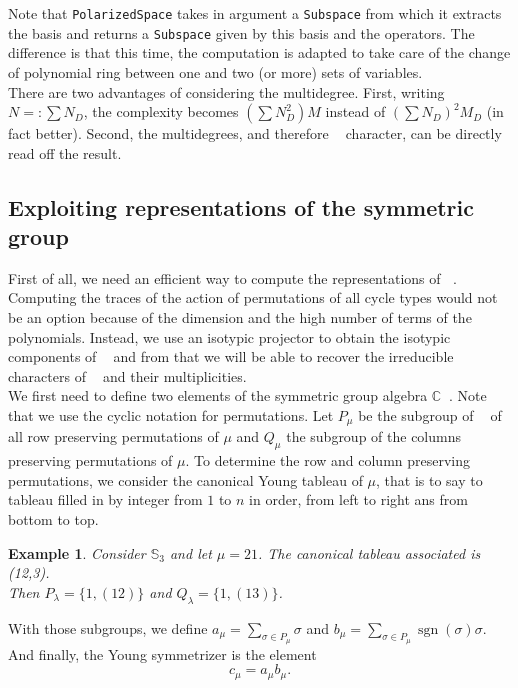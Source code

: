 \documentclass[letter,12pt]{article}
\newcommand{\CC}{\mathbb{C}}
\newcommand{\Sym}[1]{\mathbb{S}_{#1}}
\DeclareMathOperator{\Sn}{\mathbb{S}_n}
\DeclareMathOperator{\GLr}{GL_r}
\DeclareMathOperator{\sgn}{sgn}
\newtheorem{example}{Example}
\newcommand{\tableau}{\YFrench \Yboxdim{10pt}\young}
\begin{document}
	Note that \texttt{PolarizedSpace} takes in argument a \texttt{Subspace} from which it extracts the basis and returns a \texttt{Subspace} given by this basis and the operators. The difference is that this time, the computation is adapted to take care of the change of polynomial ring between one and two (or more) sets of variables. \\
	
	There are two advantages of considering the multidegree. 
	First, writing $N=:\sum N_D$, the complexity becomes $(\sum N_D^2) M$ instead of $(\sum N_D)^2M_D$ (in fact better).
	Second, the multidegrees, and therefore $\GLr$ character, can be directly read off the result.
	
	\subsection{Exploiting representations of the symmetric group}
	
	First of all, we need an efficient way to compute the representations of $\Sn$. Computing the traces of the action of permutations of all cycle types would not be an option because of the dimension and the high number of terms of the polynomials. 
	Instead, we use an isotypic projector to obtain the isotypic components of $\Sn$ and from that we will be able to recover the irreducible characters of $\Sn$ and their multiplicities. \\
	
	We first need to define two elements of the symmetric group algebra $\CC \Sn$. Note that we use the cyclic notation for permutations.
	Let $P_{\mu}$ be the subgroup of $\Sn$ of all row preserving permutations of $\mu$ and $Q_{\mu}$ the subgroup of the columns preserving permutations of $\mu$. To determine the row and column preserving permutations, we consider the canonical Young tableau of $\mu$, that is to say to tableau filled in by integer from $1$ to $n$ in order, from left to right ans from bottom to top. 
	\begin{example} Consider $\Sym{3}$ and let $\mu = 21$.
		The canonical tableau associated is \tableau(12,3).\\
		Then $P_\lambda = \{1, (12)\}$ and $Q_\lambda = \{1, (13)\}$.
	\end{example}
	
	With those subgroups, we define $a_{\mu} = \sum_{\sigma \in P_{\mu}} \sigma$ and  $b_{\mu} = \sum_{\sigma \in P_{\mu}} \sgn(\sigma) \sigma$. And finally, the Young symmetrizer is the element $$c_{\mu} = a_{\mu} b_{\mu}.$$
	
\end{document}
